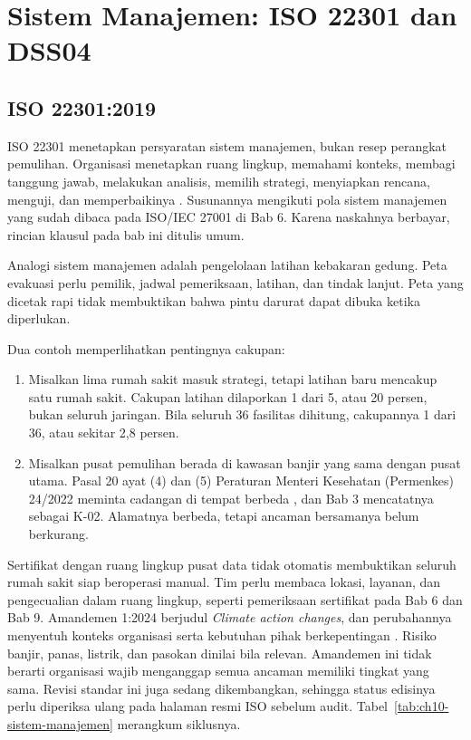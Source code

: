 \section{Sistem Manajemen: ISO 22301 dan DSS04}

\subsection*{ISO 22301:2019}

ISO 22301 menetapkan persyaratan sistem manajemen, bukan resep perangkat pemulihan. Organisasi
menetapkan ruang lingkup, memahami konteks, membagi tanggung jawab, melakukan analisis, memilih
strategi, menyiapkan rencana, menguji, dan memperbaikinya \cite{iso22301-2019}. Susunannya
mengikuti pola sistem manajemen yang sudah dibaca pada ISO/IEC 27001 di Bab 6. Karena naskahnya
berbayar, rincian klausul pada bab ini ditulis umum.

Analogi sistem manajemen adalah pengelolaan latihan kebakaran gedung. Peta evakuasi perlu pemilik,
jadwal pemeriksaan, latihan, dan tindak lanjut. Peta yang dicetak rapi tidak membuktikan bahwa
pintu darurat dapat dibuka ketika diperlukan.

Dua contoh memperlihatkan pentingnya cakupan:
\begin{enumerate}
  \item Misalkan lima rumah sakit masuk strategi, tetapi latihan baru mencakup satu rumah sakit.
  Cakupan latihan dilaporkan 1 dari 5, atau 20 persen, bukan seluruh jaringan. Bila seluruh 36
  fasilitas dihitung, cakupannya 1 dari 36, atau sekitar 2,8 persen.
  \item Misalkan pusat pemulihan berada di kawasan banjir yang sama dengan pusat utama. Pasal 20
  ayat (4) dan (5) Peraturan Menteri Kesehatan (Permenkes) 24/2022 meminta cadangan di tempat
  berbeda \cite{permenkes24-2022}, dan Bab 3 mencatatnya sebagai K-02. Alamatnya berbeda, tetapi
  ancaman bersamanya belum berkurang.
\end{enumerate}

Sertifikat dengan ruang lingkup pusat data tidak otomatis membuktikan seluruh rumah sakit siap
beroperasi manual. Tim perlu membaca lokasi, layanan, dan pengecualian dalam ruang lingkup, seperti
pemeriksaan sertifikat pada Bab 6 dan Bab 9. Amandemen 1:2024 berjudul \textit{Climate action
changes}, dan perubahannya menyentuh konteks organisasi serta kebutuhan pihak berkepentingan
\cite{c10-iso22301-amd2024}. Risiko banjir, panas, listrik, dan pasokan dinilai bila relevan.
Amandemen ini tidak berarti organisasi wajib menganggap semua ancaman memiliki tingkat yang sama.
Revisi standar ini juga sedang dikembangkan, sehingga status edisinya perlu diperiksa ulang pada
halaman resmi ISO sebelum audit. Tabel~\ref{tab:ch10-sistem-manajemen} merangkum siklusnya.

